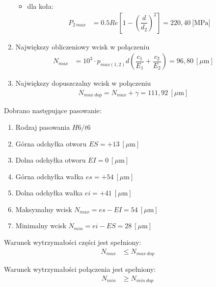 \begin{enumerate}
\begin{itemize}
				\item dla koła:
				\begin{align}
				P_{2 \ max} &= 0.5 Re \left[1 - \left(\dfrac{d}{d_2}\right)^2\right] = 220,40 \ \text{[MPa]}
				\end{align}
			\end{itemize}

			\item Największy obliczeniowy wcisk w połączeniu
			\begin{align}
				N_{max} &= 10^3 \cdot p_{max (1,2)} d \left(\dfrac{c_1}{E_1} + \dfrac{c_2}{E_2}\right) = 96,80 \ [\mu \text{m}] 
			\end{align}

			\item Największy dopuszczalny wcisk w połączeniu
			\begin{align}
				N_{max \ dop} = N_{max} + \gamma = 111,92 \ [\mu \text{m}]
			\end{align}
			\end{enumerate}
			
			\par Dobrano następujące pasowanie:
			\begin{enumerate}
				\item Rodzaj pasowania \tab $H6/t6$
				
				\item Górna odchyłka otworu	\tab $ES = +13 \ [\mu \text{m}]$
				\item Dolna odchyłka otworu \tab $EI = 0 \ [\mu \text{m}]$
				\item Górna odchyłka wałka \tab $es = +54 \ [\mu \text{m}]$
				\item Dolna odchyłka wałka \tab $ei = +41 \ [\mu \text{m}]$
				\item Maksymalny wcisk \tab $N_{max} = es - EI = 54 \ [\mu \text{m}]$
				\item Minimalny wcisk \tab $N_{min} = ei - ES = 28 \ [\mu \text{m}]$ \\
			\end{enumerate}
		
		
		\noindent Warunek wytrzymałości części jest spełniony:
		\begin{align}
			N_{max} &\leq N_{max \ dop} 
		\end{align}
		
		\noindent Warunek wytrzymałości połączenia jest spełniony:
		\begin{align}
			N_{min} &\geq N_{min \ dop} 
		\end{align}
		
